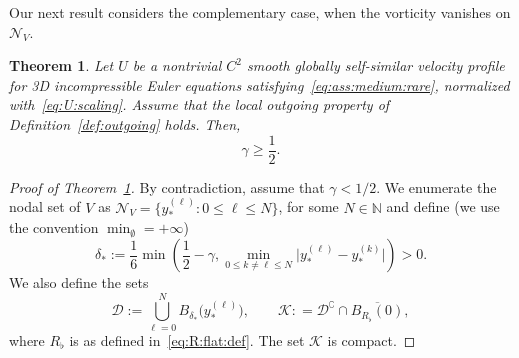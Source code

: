 \documentclass[11pt,reqno]{amsproc}
\numberwithin{equation}{section}
\newtheorem{theorem}{Theorem}[section]
\theoremstyle{remark}
\begin{document}
Our next result considers the complementary case, when the vorticity vanishes on $\mathcal{N}_V$. 

\begin{theorem}
\label{thm:outgoing:global:new}
Let $U$ be a nontrivial $C^2$ smooth globally self-similar velocity profile for 3D incompressible Euler equations satisfying~\eqref{eq:ass:medium:rare}, normalized with~\eqref{eq:U:scaling}. 
Assume that the local outgoing property of Definition~\ref{def:outgoing} holds. Then, 
\[
\gamma \geq \frac12.
\]
\end{theorem}

\begin{proof}[Proof of Theorem~\ref{thm:outgoing:global:new}]
By contradiction, assume that $\gamma < 1/2$. 
We enumerate the nodal set of $V$ as $\mathcal{N}_V = \{ y_*^{(\ell)} \colon 0\leq \ell  \leq N\}$, for some $N\in \mathbb{N}$ and define (we use the convention $\min_{\emptyset} = + \infty$)
\begin{equation}
\delta_* := \frac16  \min\left( \frac 12 - \gamma , \min_{0\leq k\neq \ell \leq N} \bigl|y_*^{(\ell)} - y_*^{(k)}\bigr| \right) >0. 
\label{eq:delta:star:def}
\end{equation}
We also define the sets
\begin{equation*}
\mathcal{D} := \bigcup\limits_{\ell = 0}^{N} B_{\delta_*}\bigl(y_*^{(\ell)}\bigr),
\qquad
\mathcal{K}: = \mathcal{D}^\complement \cap \overline{B_{R_\flat}(0)},
\end{equation*}
where $R_\flat$ is as defined in~\eqref{eq:R:flat:def}. The set $\mathcal{K}$ is compact.


\end{proof}
\end{document}
